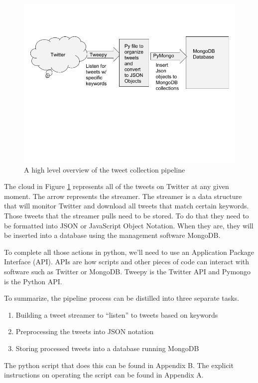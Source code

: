 \documentclass[11pt, twoside, reqno]{book}
\begin{document}
\begin{figure}[H]
	\centering
	\includegraphics[scale=0.5]{data_collection}
	\caption{A high level overview of the tweet collection pipeline}
	\label{fig:datacollection}
\end{figure}

The cloud in Figure \ref{fig:datacollection} represents all of the tweets on Twitter at any given moment. The arrow represents the streamer. The streamer is a data structure that will monitor Twitter and download all tweets that match certain keywords. Those tweets that the streamer pulls need to be stored. To do that they need to be formatted into JSON or JavaScript Object Notation. When they are, they will be inserted into a database using the management software MongoDB. 

To complete all those actions in python, we'll need to use an Application Package Interface (API). APIs are how scripts and other pieces of code can interact with software such as Twitter or MongoDB. Tweepy is the Twitter API and Pymongo is the Python API. 
 
To summarize, the pipeline process can be distilled into three separate tasks. 
\begin{enumerate}
	\item Building a tweet streamer to ``listen'' to tweets based on keywords
	\item Preprocessing the tweets into JSON notation
	\item Storing processed tweets into a database running MongoDB 
\end{enumerate}
The python script that does this can be found in Appendix B. The explicit instructions on operating the script can be found in Appendix A. 
\end{document}
